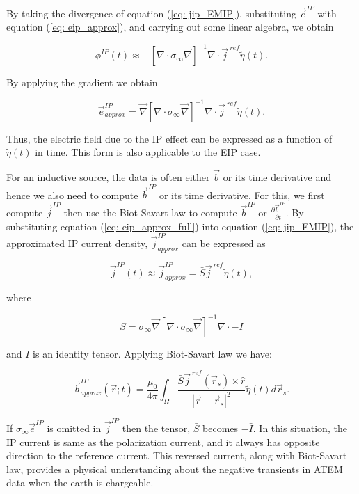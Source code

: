 \documentclass[extra,mreferee]{gji}
\renewcommand{\div}{\nabla\cdot}
\newcommand{\grad}{\vec \nabla}
\newcommand{\siginf}{\sigma_\infty}
\renewcommand {\j}  { {\vec j} }
\renewcommand {\b}  { {\vec b} }
\newcommand {\e}  { {\vec e} }
\newcommand{\peta}{\tilde{\eta}}
\newcommand{\jref}{\j^{\ ref}}
\begin{document}
By taking the divergence of  equation (\ref{eq: jip_EMIP}), substituting  $\e^{IP}$ with equation (\ref{eq: eip_approx}), and carrying out some linear algebra, we obtain
\begin{linenomath*}
\begin{equation}
  \phi^{IP}(t) \approx -[\div \siginf\grad]^{-1}\div\jref\peta(t).
  \label{eq: phiIPapprox_general}
\end{equation}
\end{linenomath*}
By applying the gradient we obtain 
\begin{linenomath*}
\begin{equation}
    \e^{IP}_{approx} = \grad[\div \siginf\grad]^{-1}\div\jref\peta(t).
    \label{eq: eip_approx_full}
\end{equation}
\end{linenomath*}
Thus, the electric field due to the IP effect can be expressed as a function of $\peta(t)$ in time. 
This form is also applicable to the  EIP case.   

For an inductive source, the data is often either $\b$ or its time derivative and hence we also need to compute $\b^{IP}$ or its time derivative.
For this, we first compute $\j^{IP}$ then use the Biot-Savart law to compute $\b^{IP}$ or $\frac{\partial \b^{IP}}{\partial t}$. 
By substituting equation (\ref{eq: eip_approx_full}) into equation (\ref{eq: jip_EMIP}), the approximated IP current density, $\j^{IP}_{approx}$ can be expressed as
\begin{linenomath*}
\begin{equation}
  \j^{IP}(t) \approx \j^{IP}_{approx} = \bar{S}\jref\peta(t),
  \label{eq: jip_approx}
\end{equation}
\end{linenomath*}
where
\begin{linenomath*}
\begin{equation}
  \bar{S} = \siginf\grad[\div \siginf\grad]^{-1}\div-\bar{I}
\end{equation}
\end{linenomath*}
and $\bar{I}$ is an identity tensor. 
Applying Biot-Savart law we have:
\begin{linenomath*}
\begin{equation}
  \b^{IP}_{approx}(\vec{r}; t) = \frac{\mu_0}{4\pi}\int_{\Omega}  \frac{\bar{S}\j^{\ ref}(\vec{r}_s)\times\hat{r}}{|\vec{r}-\vec{r}_s|^2}\peta(t)d\vec{r}_s.
  \label{eq: BiotbIP_approx}
\end{equation}
\end{linenomath*}
If $\siginf\e^{IP}$ is omitted in  $\j^{IP}$ then the tensor, $\bar{S}$ becomes $-\bar{I}$. 
In this situation, the IP current is same as the polarization current, and it always has opposite direction to the reference current. 
This reversed current, along with Biot-Savart law,  provides a physical understanding about the negative transients in ATEM data when the earth is chargeable. 
\end{document}
